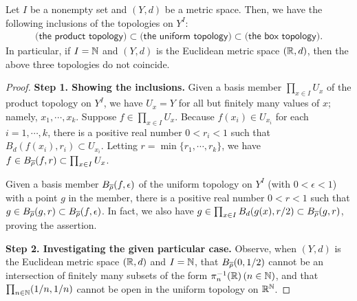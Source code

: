 \begin{prop}
    Let $I$ be a nonempty set and $(Y, d)$ be a metric space.
    Then, we have the following inclusions of the topologies on $Y^I$:
    \begin{align*}
        \textsf{(the product topology)}\subset\textsf{(the uniform topology)}\subset\textsf{(the box topology)}.
    \end{align*}
    In particular, if $I={\mathbb{N}}$ and $(Y, d)$ is the Euclidean metric space $({\mathbb{R}}, d)$, then the above three topologies do not coincide.
\end{prop}
\begin{proof}
    \textbf{Step 1. Showing the inclusions.}\newline\noindent
    Given a basis member $\prod_{x\in I} U_x$ of the product topology on $Y^I$, we have $U_x=Y$ for all but finitely many values of $x$; namely, $x_1, \cdots, x_k$.
    Suppose $f\in \prod_{x\in I} U_x$.
    Because $f(x_i)\in U_{x_i}$ for each $i=1, \cdots, k$, there is a positive real number $0<r_i<1$ such that $B_d(f(x_i), r_i)\subset U_{x_i}$.
    Letting $r=\min\{r_1, \cdots, r_k\}$, we have $f\in B_{\overline{\rho}}(f, r)\subset \prod_{x\in I} U_x$.

    Given a basis member $B_{\overline{\rho}}(f, \epsilon)$ of the uniform topology on $Y^I$ (with $0<\epsilon<1$) with a point $g$ in the member, there is a positive real number $0<r<1$ such that $g\in B_{\overline{\rho}}(g, r)\subset B_{\overline{\rho}}(f, \epsilon)$.
    In fact, we also have $g\in \prod_{x\in I} B_d(g(x), r/2)\subset B_{\overline{\rho}}(g, r)$, proving the assertion.

    \textbf{Step 2. Investigating the given particular case.}\newline\noindent
    Observe, when $(Y, d)$ is the Euclidean metric space $({\mathbb{R}}, d)$ and $I={\mathbb{N}}$, that $B_{\overline{\rho}}(0, 1/2)$ cannot be an intersection of finitely many subsets of the form $\pi_n^{-1}({\mathbb{R}})\, (n\in{\mathbb{N}})$, and that $\prod_{n\in{\mathbb{N}}}(1/n, 1/n)$ cannot be open in the uniform topology on ${\mathbb{R}}^{\mathbb{N}}$.
\end{proof}